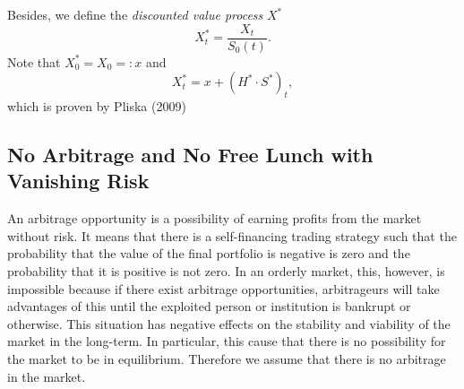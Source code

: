 \documentclass[a4paper]{article}
\theoremstyle{definition}
\numberwithin{equation}{section}
\begin{document}
Besides, we define the \emph{discounted value process} $X^*$
$$X^*_t=\frac{X_t}{S_0(t)}.$$
Note that $X^*_0=X_0=:x$ and
$$X^*_t=x+(H^*\cdot S^*)_t,$$
which is proven by Pliska (2009)~\cite{book2}

\subsection{No Arbitrage and No Free Lunch with Vanishing Risk}
An arbitrage opportunity is a possibility of earning profits from the market without risk. It means that there is a self-financing trading strategy such that the probability that the value of the final portfolio is negative is zero and the probability that it is positive is not zero. In an orderly market, this, however, is impossible because if there exist arbitrage opportunities, arbitrageurs will take advantages of this until the exploited person or institution is bankrupt or otherwise. This situation has negative effects on the stability and viability of the market in the long-term. In particular, this cause that there is no possibility for the market to be in equilibrium. Therefore we assume that there is no arbitrage in the market.
\end{document}
